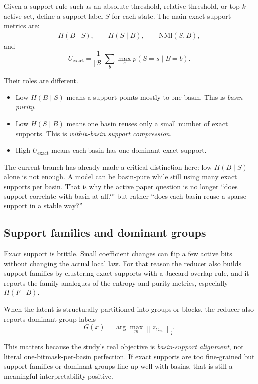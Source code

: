 \documentclass[11pt]{article}
\newcommand{\norm}[1]{\left\lVert #1 \right\rVert}
\begin{document}
Given a support rule such as an absolute threshold, relative threshold, or
top-$k$ active set, define a support label $S$ for each state. The main exact
support metrics are:
\begin{align}
    H(B \mid S), \qquad H(S \mid B), \qquad \mathrm{NMI}(S,B),
\end{align}
and
\begin{equation}
    U_{\text{exact}}
    =
    \frac{1}{|\mathcal{B}|}
    \sum_{b}
    \max_s p(S=s \mid B=b).
\end{equation}

Their roles are different.
\begin{itemize}[leftmargin=1.5em]
    \item Low $H(B \mid S)$ means a support points mostly to one basin. This is
    \emph{basin purity}.
    \item Low $H(S \mid B)$ means one basin reuses only a small number of exact
    supports. This is \emph{within-basin support compression}.
    \item High $U_{\text{exact}}$ means each basin has one dominant exact
    support.
\end{itemize}

The current branch has already made a critical distinction here: low
$H(B \mid S)$ alone is not enough. A model can be basin-pure while still using
many exact supports per basin. That is why the active paper question is no
longer ``does support correlate with basin at all?'' but rather ``does each
basin reuse a sparse support in a stable way?''

\subsection{Support families and dominant groups}

Exact support is brittle. Small coefficient changes can flip a few active bits
without changing the actual local law. For that reason the reducer also builds
support families by clustering exact supports with a Jaccard-overlap rule, and
it reports the family analogues of the entropy and purity metrics, especially
$H(F \mid B)$.

When the latent is structurally partitioned into groups or blocks, the reducer
also reports dominant-group labels
\begin{equation}
    G(x) = \arg\max_m \norm{z_{G_m}}_2.
\end{equation}

This matters because the study's real objective is \emph{basin-support
alignment}, not literal one-bitmask-per-basin perfection. If exact supports are
too fine-grained but support families or dominant groups line up well with
basins, that is still a meaningful interpretability positive.
\end{document}
